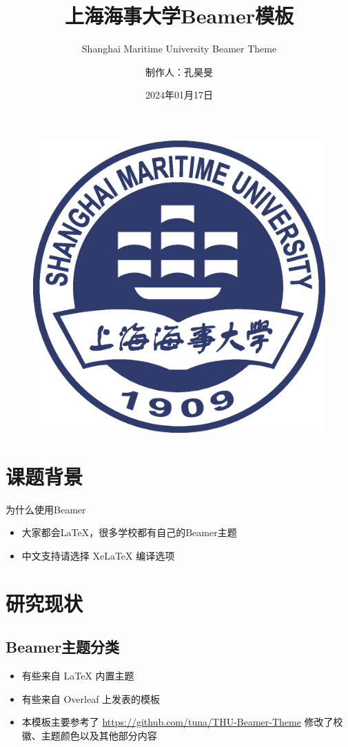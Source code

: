 \documentclass{beamer}
\author{\CJKfamily{SimHei}制作人：孔昊旻}
\title{上海海事大学Beamer模板}
\subtitle{Shanghai Maritime University Beamer Theme}
\institute{上海海事大学 物流科学与工程研究院}
\date{2024年01月17日}
\begin{document}
	\kaishu
	\begin{frame}
		\titlepage
		\begin{figure}[htpb]
			\begin{center}
				\includegraphics[width=0.2\linewidth]
				{Template/Pic/Shanghai_Maritime_University_Logo.eps}
			\end{center}
		\end{figure}
	\end{frame}

	\begin{frame}
		\tableofcontents[sectionstyle=show,subsectionstyle=show/shaded/hide,subsubsectionstyle=show/shaded/hide]
	\end{frame}


	\section{课题背景}

	\begin{frame}{为什么使用Beamer}
		\begin{itemize}[<+-| alert@+>] %
			\item 大家都会\LaTeX{}，很多学校都有自己的Beamer主题
			\item 中文支持请选择 Xe\LaTeX{} 编译选项
		\end{itemize}
	\end{frame}


	\section{研究现状}

	\subsection{Beamer主题分类}

	\begin{frame}
		\begin{itemize}
			\item 有些来自 \LaTeX{} 内置主题
			\item 有些来自 Overleaf 上发表的模板
			\item 本模板\cite{origin}主要参考了 \newline
			\url{https://github.com/tuna/THU-Beamer-Theme}
			\newline
			修改了校徽、主题颜色以及其他部分内容\cite{shmtu_vi}
		\end{itemize}
	\end{frame}
\end{document}
